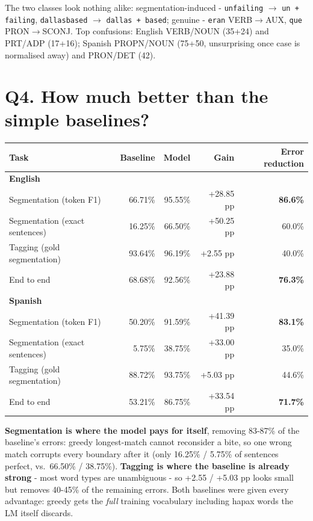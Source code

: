 \documentclass[11pt,a4paper]{article}
\begin{document}
\medskip\noindent The two classes look nothing alike:
segmentation-induced - \texttt{unfailing} $\rightarrow$ \texttt{un + failing},
\texttt{dallasbased} $\rightarrow$ \texttt{dallas + based};
genuine - \texttt{eran} VERB$\rightarrow$AUX, \texttt{que}
PRON$\rightarrow$SCONJ. Top confusions: English VERB/NOUN (35+24) and PRT/ADP
(17+16); Spanish PROPN/NOUN (75+50, unsurprising once case is normalised away)
and PRON/DET (42).

\section*{Q4. How much better than the simple baselines?}

\begin{center}
\begin{tabular}{lrrrr}
\toprule
Task & Baseline & Model & Gain & Error reduction \\
\midrule
\multicolumn{5}{l}{\textbf{English}} \\
Segmentation (token F1) & 66.71\% & 95.55\% & +28.85 pp & \textbf{86.6\%} \\
Segmentation (exact sentences) & 16.25\% & 66.50\% & +50.25 pp & 60.0\% \\
Tagging (gold segmentation) & 93.64\% & 96.19\% & +2.55 pp & 40.0\% \\
End to end & 68.68\% & 92.56\% & +23.88 pp & \textbf{76.3\%} \\
\multicolumn{5}{l}{\textbf{Spanish}} \\
Segmentation (token F1) & 50.20\% & 91.59\% & +41.39 pp & \textbf{83.1\%} \\
Segmentation (exact sentences) & 5.75\% & 38.75\% & +33.00 pp & 35.0\% \\
Tagging (gold segmentation) & 88.72\% & 93.75\% & +5.03 pp & 44.6\% \\
End to end & 53.21\% & 86.75\% & +33.54 pp & \textbf{71.7\%} \\
\bottomrule
\end{tabular}
\end{center}

\noindent \textbf{Segmentation is where the model pays for itself}, removing
83-87\% of the baseline's errors: greedy longest-match cannot reconsider a bite,
so one wrong match corrupts every boundary after it (only 16.25\% / 5.75\% of
sentences perfect, vs.\ 66.50\% / 38.75\%). \textbf{Tagging is where the baseline
is already strong} - most word types are unambiguous - so +2.55 / +5.03 pp
looks small but removes 40-45\% of the remaining errors. Both baselines were
given every advantage: greedy gets the \emph{full} training vocabulary including
hapax words the LM itself discards.
\end{document}
